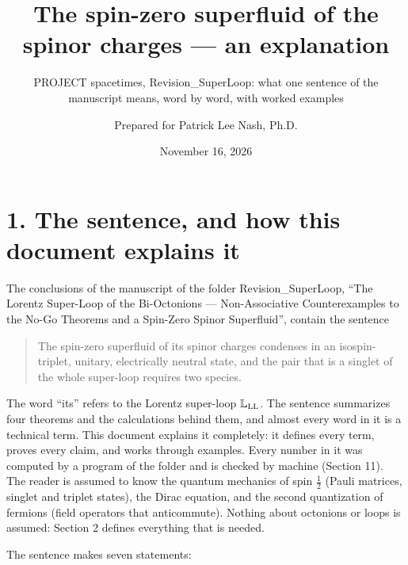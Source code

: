 \documentclass[
  10pt,
]{article}
\title{The spin-zero superfluid of the spinor charges --- an
explanation}
\subtitle{PROJECT spacetimes, Revision\_SuperLoop: what one sentence of
the manuscript means, word by word, with worked examples}
\author{Prepared for Patrick Lee Nash, Ph.D.}
\date{November 16, 2026}
\begin{document}
\maketitle

\hypertarget{the-sentence-and-how-this-document-explains-it}{%
\section{1. The sentence, and how this document explains
it}\label{the-sentence-and-how-this-document-explains-it}}

The conclusions of the manuscript of the folder Revision\_SuperLoop,
``The Lorentz Super-Loop of the Bi-Octonions --- Non-Associative
Counterexamples to the No-Go Theorems and a Spin-Zero Spinor
Superfluid'', contain the sentence

\begin{quote}
The spin-zero superfluid of its spinor charges condenses in an
isospin-triplet, unitary, electrically neutral state, and the pair that
is a singlet of the whole super-loop requires two species.
\end{quote}

The word ``its'' refers to the Lorentz super-loop
\(\mathbb L_{\rm LL}\). The sentence summarizes four theorems and the
calculations behind them, and almost every word in it is a technical
term. This document explains it completely: it defines every term,
proves every claim, and works through examples. Every number in it was
computed by a program of the folder and is checked by machine (Section
11). The reader is assumed to know the quantum mechanics of spin
\(\tfrac12\) (Pauli matrices, singlet and triplet states), the Dirac
equation, and the second quantization of fermions (field operators that
anticommute). Nothing about octonions or loops is assumed: Section 2
defines everything that is needed.

The sentence makes seven statements:
\end{document}
